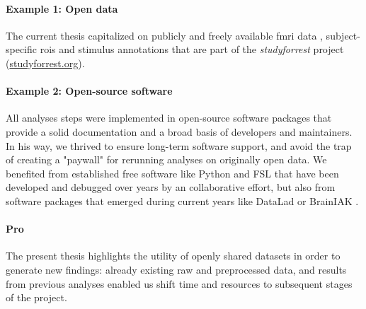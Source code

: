 \paragraph{Example 1: Open data}

The current thesis capitalized on publicly and freely available
%
\ac{fmri} data \citep{hanke2014audiomovie, hanke2016simultaneous,
sengupta2016extension},
%
subject-specific \acp{roi} \citep{sengupta2016extension} and
%
stimulus annotations \citep{haeusler2016cutanno}
%
that are part of the \textit{studyforrest} project
(\href{www.studyforrest.org}{\url{studyforrest.org}}).


\paragraph{Example 2: Open-source software}

All analyses steps were implemented in open-source software packages that
provide a solid documentation and a broad basis of developers and maintainers.
%
In his way, we thrived to ensure long-term software support, and avoid the trap
of creating a "paywall" for rerunning analyses on originally open data.
%
We benefited from established free software like
%
Python and
%
FSL \citep[\href{https://www.fmrib.ox.ac.uk/fsl}{FMRIB's Software
Library;}][]{smith2004fsl} that have been developed and debugged over years by
an collaborative effort,
%
but also from software packages that emerged during current years like
%
DataLad
\citep[\href{www.datalad.org}{\url{datalad.org}};][]{halchenko2021datalad} or
%
BrainIAK
\citep[\href{https://brainiak.org}{\url{brainiak.org}};][]{kumar2020brainiak,
kumar2020brainiaktutorial}.




\paragraph{Pro}


%
The present thesis highlights the utility of openly shared datasets in order to
generate new findings:
%
already existing raw and preprocessed data, and results from previous analyses
enabled us shift time and resources to subsequent stages of the project.

